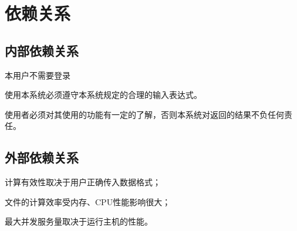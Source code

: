 \chapter{依赖关系}

\section{内部依赖关系}

本用户不需要登录

使用本系统必须遵守本系统规定的合理的输入表达式。

使用者必须对其使用的功能有一定的了解，否则本系统对返回的结果不负任何责任。

\section{外部依赖关系}

计算有效性取决于用户正确传入数据格式；

文件的计算效率受内存、CPU性能影响很大；

最大并发服务量取决于运行主机的性能。
